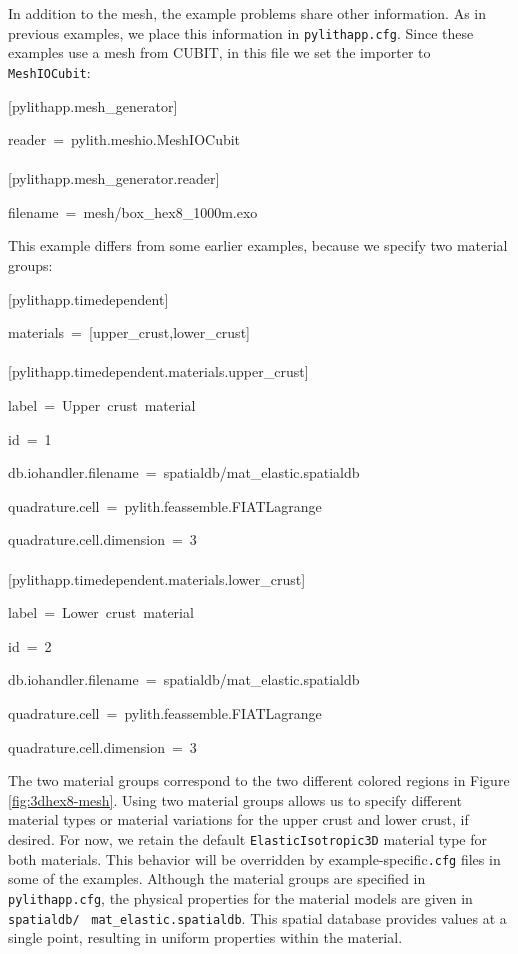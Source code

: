 In addition to the mesh, the example problems share other information.
As in previous examples, we place this information in \texttt{pylithapp.cfg}.
Since these examples use a mesh from CUBIT, in this file we set the
importer to \texttt{MeshIOCubit}:
\begin{lyxcode}
{[}pylithapp.mesh\_generator{]}

reader~=~pylith.meshio.MeshIOCubit~\\
~\\


{[}pylithapp.mesh\_generator.reader{]}

filename~=~mesh/box\_hex8\_1000m.exo
\end{lyxcode}
This example differs from some earlier examples, because we specify
two material groups:
\begin{lyxcode}
{[}pylithapp.timedependent{]}

materials~=~{[}upper\_crust,lower\_crust{]}~\\
~\\


{[}pylithapp.timedependent.materials.upper\_crust{]}

label~=~Upper~crust~material

id~=~1

db.iohandler.filename~=~spatialdb/mat\_elastic.spatialdb

quadrature.cell~=~pylith.feassemble.FIATLagrange

quadrature.cell.dimension~=~3~\\
~\\


{[}pylithapp.timedependent.materials.lower\_crust{]}

label~=~Lower~crust~material

id~=~2

db.iohandler.filename~=~spatialdb/mat\_elastic.spatialdb

quadrature.cell~=~pylith.feassemble.FIATLagrange

quadrature.cell.dimension~=~3
\end{lyxcode}
The two material groups correspond to the two different colored regions
in Figure \vref{fig:3dhex8-mesh}. Using two material groups allows
us to specify different material types or material variations for
the upper crust and lower crust, if desired. For now, we retain the
default \texttt{ElasticIsotropic3D} material type for both materials.
This behavior will be overridden by example-specific\texttt{.cfg}
files in some of the examples. Although the material groups are specified
in \texttt{pylithapp.cfg}, the physical properties for the material
models are given in \texttt{spatialdb/}~\linebreak{}
\texttt{mat\_elastic.spatialdb}. This spatial database provides values
at a single point, resulting in uniform properties within the material.


